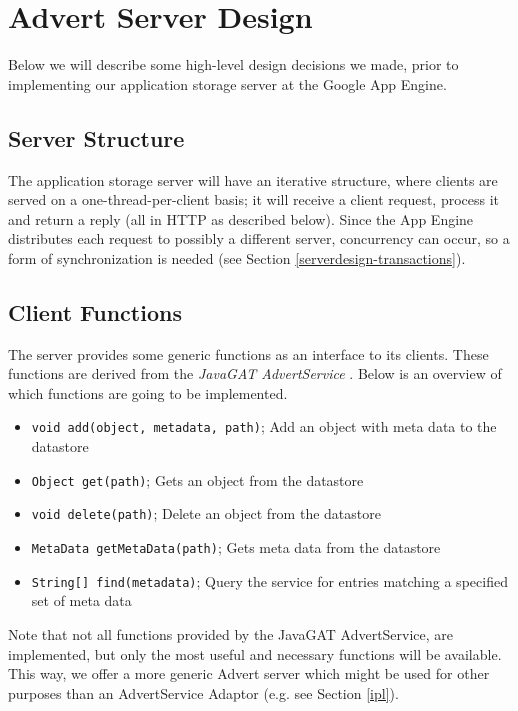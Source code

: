 \section{Advert Server Design}
\label{serverdesign}
Below we will describe some high-level design decisions we made, prior to
implementing our application storage server at the Google App Engine.

\subsection{Server Structure}
\label{server-design-structure}
The application storage server will have an iterative structure, where clients
are served on a one-thread-per-client basis; it will receive a client request,
process it and return a reply (all in HTTP as described below). Since the App
Engine distributes each request to possibly a different server, concurrency can
occur, so a form of synchronization is needed (see Section
\ref{serverdesign-transactions}).

\subsection{Client Functions}
The server provides some generic functions as an interface to its clients. These
functions are derived from the \emph{JavaGAT AdvertService} \cite{javagat-www}. 
Below is an overview of which functions are going to be implemented.

\begin{itemize}
	\item \texttt{void add(object, metadata, path)}; Add an object with meta data to
		the datastore
	\item \texttt{Object get(path)}; Gets an object from the datastore
	\item \texttt{void delete(path)}; Delete an object from the datastore
	\item \texttt{MetaData getMetaData(path)}; Gets meta data from the datastore
	\item \texttt{String[] find(metadata)}; Query the service for entries matching
		a specified set of meta data 
\end{itemize}

Note that not all functions provided by the JavaGAT AdvertService, are
implemented, but only the most useful and necessary functions will be
available. This way, we offer a more generic Advert server which might be
used for other purposes than an AdvertService Adaptor (e.g. see Section
\ref{ipl}).

